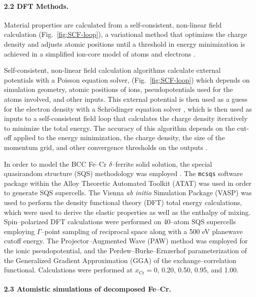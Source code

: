 \documentclass[final,3p,times]{elsarticle}
\begin{document}
\paragraph{2.2 DFT Methods.}

Material properties are calculated from a self-consistent, non-linear field calculation (Fig.~\ref{fig:SCF-loop}), a variational method that optimizes the charge density and adjusts atomic positions until a threshold in energy minimization is achieved in a simplified ion-core model of atoms and electrons \cite{Schwingenschloegl2004}.

Self-consistent, non-linear field calculation algorithms calculate external potentials with a Poisson equation solver, (Fig.~\ref{fig:SCF-loop}) which depends on simulation geometry, atomic positions of ions, pseudopotentials used for the atoms involved, and other inputs. This external potential is then used as a guess for the electron density with a Schr\"{o}dinger equation solver \cite{giustino2014materials}, which is then used as inputs to a self-consistent field loop that calculates the charge density iteratively to minimize the total energy. The accuracy of this algorithm depends on the cut-off applied to the energy minimization, the charge density, the size of the momentum grid, and other convergence thresholds on the outputs \cite{hung2022quantum, Schwingenschloegl2004, giustino2014materials}.

In order to model the BCC Fe--Cr $\delta$--ferrite solid solution, the special quasirandom structure (SQS) methodology was employed \cite{VandeWalleLiu2013}.
The \texttt{mcsqs} software package within the Alloy Theoretic Automated Toolkit (ATAT) was used in order to generate SQS supercells.
The Vienna \textit{ab initio} Simulation Package (VASP) \cite{kresse1996vasp} was used to perform the density functional theory (DFT) total energy calculations, which were used to derive the elastic properties as well as the enthalpy of mixing.
Spin--polarized DFT calculations were performed on 40--atom SQS supercells employing $\Gamma$--point sampling of reciprocal space along with a 500 eV planewave cutoff energy.
The Projector--Augmented Wave (PAW) method \cite{kresse1999paw} was employed for the ionic pseudopotential, and the Perdew--Burke--Ernzerhof parameterization \cite{pbe1996} of the Generalized Gradient Approximation (GGA) of the exchange--correlation functional. Calculations were performed at $x_{\mathrm{Cr}} = 0$, 0.20, 0.50, 0.95, and 1.00.

\paragraph{2.3 Atomistic simulations of decomposed Fe--Cr.}
\end{document}

